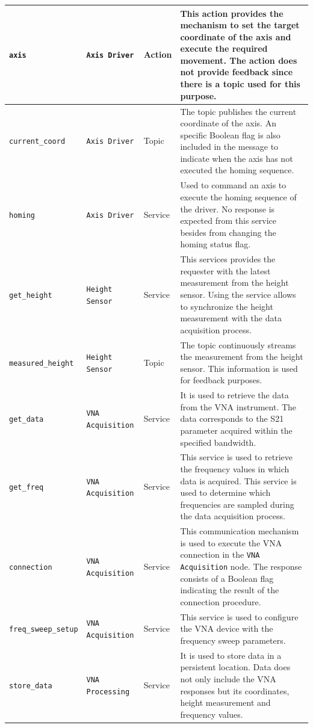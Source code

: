 \documentclass{article}
\begin{document}
\begin{singlespace}
\begin{xltabular}{\textwidth}{|p{5cm}|l|l|X|}
        \texttt{axis} & \texttt{Axis Driver} & Action & This action provides the mechanism to set the target coordinate of the axis and execute the required movement. The action does not provide feedback since there is a topic used for this purpose. \\ \hline
        \texttt{current\_coord} & \texttt{Axis Driver} & Topic & The topic publishes the current coordinate of the axis. An specific Boolean flag is also included in the message to indicate when the axis has not executed the homing sequence. \\ \hline
        \texttt{homing} & \texttt{Axis Driver} & Service & Used to command an axis to execute the homing sequence of the driver. No response is expected from this service besides from changing the homing status flag. \\ \hline
        \texttt{get\_height} & \texttt{Height Sensor} & Service & This services provides the requester with the latest measurement from the height sensor. Using the service allows to synchronize the height measurement with the data acquisition process. \\ \hline
        \texttt{measured\_height} & \texttt{Height Sensor} & Topic & The topic continuously streams the measurement from the height sensor. This information is used for feedback purposes. \\ \hline
        \texttt{get\_data} & \texttt{VNA Acquisition} & Service & It is used to retrieve the data from the VNA instrument. The data corresponds to the S21 parameter acquired within the specified bandwidth. \\ \hline
        \texttt{get\_freq} & \texttt{VNA Acquisition} & Service & This service is used to retrieve the frequency values in which data is acquired. This service is used to determine which frequencies are sampled during the data acquisition process. \\ \hline
        \texttt{connection} & \texttt{VNA Acquisition} & Service & This communication mechanism is used to execute the VNA connection in the \texttt{VNA Acquisition} node. The response consists of a Boolean flag indicating the result of the connection procedure. \\ \hline 
        \texttt{freq\_sweep\_setup} & \texttt{VNA Acquisition} & Service & This service is used to configure the VNA device with the frequency sweep parameters. \\ \hline
        \texttt{store\_data} & \texttt{VNA Processing} & Service & It is used to store data in a persistent location. Data does not only include the VNA responses but its coordinates, height measurement and frequency values. \\ \hline
    \end{xltabular}
\end{singlespace}
\end{document}
